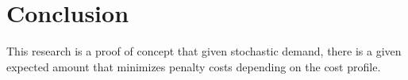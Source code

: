 \section{Conclusion}
This research is a proof of concept that given stochastic demand, there is a given expected amount that minimizes penalty costs depending on the cost profile. 